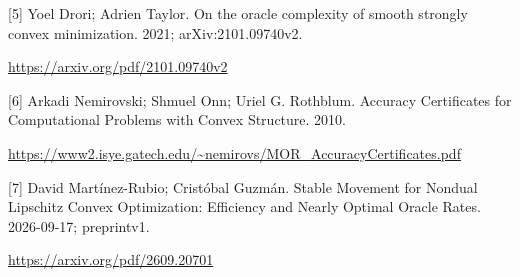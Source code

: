 \documentclass[10pt,a4paper]{article}
\begin{document}
[5] Yoel Drori; Adrien Taylor. On the oracle complexity of smooth strongly convex minimization. 2021; arXiv:2101.09740v2.

\url{https://arxiv.org/pdf/2101.09740v2}

[6] Arkadi Nemirovski; Shmuel Onn; Uriel G. Rothblum. Accuracy Certificates for Computational Problems with Convex Structure. 2010.

\url{https://www2.isye.gatech.edu/~nemirovs/MOR_AccuracyCertificates.pdf}

[7] David Martínez-Rubio; Cristóbal Guzmán. Stable Movement for Nondual Lipschitz Convex Optimization: Efficiency and Nearly Optimal Oracle Rates. 2026-09-17; preprintv1.

\url{https://arxiv.org/pdf/2609.20701}
\end{document}
